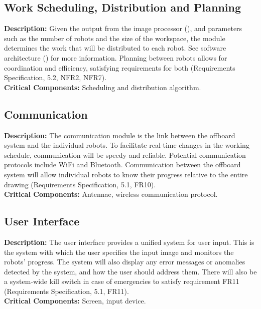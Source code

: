 \subsection{Work Scheduling, Distribution and Planning}
\label{sec:subsystem_planner}
\textbf{Description:} Given the output from the image processor (), and parameters such as the number of robots and the size of the workspace, the module determines the work that will be distributed to each robot. See software architecture () for more information. Planning between robots allows for coordination and efficiency, satisfying requirements for both (Requirements Specification, 5.2, NFR2, NFR7).\\
\textbf{Critical Components:} Scheduling and distribution algorithm.\\

\subsection{Communication}
\label{sec:subsystem_communication}
\textbf{Description:} The communication module is the link between the offboard system and the individual robots. To facilitate real-time changes in the working schedule, communication will be speedy and reliable. Potential communication protocols include WiFi and Bluetooth. Communication between the offboard system will allow individual robots to know their progress relative to the entire drawing (Requirements Specification, 5.1, FR10).\\
\textbf{Critical Components:} Antennae, wireless communication protocol.\\

\subsection{User Interface}
\label{sec:subsystem_ui}
\textbf{Description:} The user interface provides a unified system for user input. This is the system with which the user specifies the input image and monitors the robots' progress. The system will also display any error messages or anomalies detected by the system, and how the user should address them. There will also be a system-wide kill switch in case of emergencies to satisfy requirement FR11 (Requirements Specification, 5.1, FR11).\\
\textbf{Critical Components:} Screen, input device.\\


